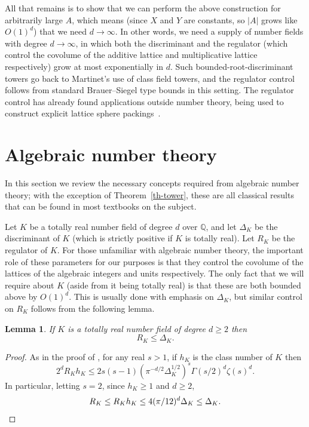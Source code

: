 \documentclass{amsart}
\numberwithin{equation}{section}
\newcommand{\bbq}{\mathbb{Q}}
\newcommand{\abs}[1]{\mathopen{}\left| #1\mathclose{}\right|}
\newtheorem{lemma}[theorem]{Lemma}
\begin{document}
All that remains is to show that we can perform the above construction for arbitrarily large $A$, which means (since $X$ and $Y$ are constants, so $\abs{A}$ grows like $O(1)^d$) that we need $d\to \infty$. In other words, we need a supply of number fields with degree \(d\to\infty\), in which both the 
discriminant and the regulator (which control the covolume of the additive lattice and multiplicative lattice respectively) grow at most exponentially in \(d\).  Such
bounded-root-discriminant towers go back to Martinet's use of class field
towers, and the regulator control follows from standard Brauer--Siegel type
bounds in this setting. The regulator control has already found applications outside number theory, being used to construct explicit lattice sphere packings~\cite[\S4]{TS91}.


\section{Algebraic number theory}
In this section we review the necessary concepts required from algebraic number theory; with the exception of Theorem~\ref{th-tower}, these are all classical results that can be found in most textbooks on the subject.

Let $K$ be a totally real number field of degree $d$ over $\bbq$, and let $\Delta_K$ be the discriminant of $K$ (which is strictly positive if $K$ is totally real). Let $R_K$ be the regulator of $K$. For those unfamiliar with algebraic number theory, the important role of these parameters for our purposes is that they control the covolume of the lattices of the algebraic integers and units respectively. The only fact that we will require about $K$ (aside from it being totally real) is that these are both bounded above by $O(1)^d$. This is usually done with emphasis on $\Delta_K$, but similar control on $R_K$ follows from the following lemma.
\begin{lemma}\label{lem-regbound}
If $K$ is a totally real number field of degree $d\geq 2$ then
\[R_K \leq \Delta_K.\]
\end{lemma}
\begin{proof}
As in the proof of \cite[XIII, Theorem 3]{La70}, for any real $s>1$, if $h_K$ is the class number of $K$ then
\[2^dR_Kh_K\leq 2s(s-1)(\pi^{-d/2}\Delta_K^{1/2})^s \Gamma(s/2)^d\zeta(s)^d.\]
In particular, letting $s=2$, since $h_K\geq 1$ and $d\geq 2$,
\[R_K\leq R_Kh_K \leq 4(\pi/12)^d\Delta_K\leq \Delta_K.\qedhere\]
\end{proof}
\end{document}
